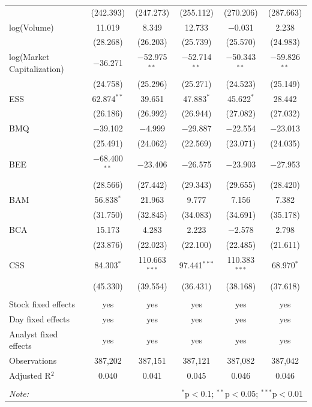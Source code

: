 \begin{tabular}{@{\extracolsep{5pt}}lccccc}
  & (242.393) & (247.273) & (255.112) & (270.206) & (287.663) \\ 
  log(Volume) & 11.019 & 8.349 & 12.733 & $-$0.031 & 2.238 \\ 
  & (28.268) & (26.203) & (25.739) & (25.570) & (24.983) \\ 
  log(Market Capitalization) & $-$36.271 & $-$52.975$^{**}$ & $-$52.714$^{**}$ & $-$50.343$^{**}$ & $-$59.826$^{**}$ \\ 
  & (24.758) & (25.296) & (25.271) & (24.523) & (25.149) \\ 
  ESS & 62.874$^{**}$ & 39.651 & 47.883$^{*}$ & 45.622$^{*}$ & 28.442 \\ 
  & (26.186) & (26.992) & (26.944) & (27.082) & (27.032) \\ 
  BMQ & $-$39.102 & $-$4.999 & $-$29.887 & $-$22.554 & $-$23.013 \\ 
  & (25.491) & (24.062) & (22.569) & (23.071) & (24.035) \\ 
  BEE & $-$68.400$^{**}$ & $-$23.406 & $-$26.575 & $-$23.903 & $-$27.953 \\ 
  & (28.566) & (27.442) & (29.343) & (29.655) & (28.420) \\ 
  BAM & 56.838$^{*}$ & 21.963 & 9.777 & 7.156 & 7.382 \\ 
  & (31.750) & (32.845) & (34.083) & (34.691) & (35.178) \\ 
  BCA & 15.173 & 4.283 & 2.223 & $-$2.578 & 2.798 \\ 
  & (23.876) & (22.023) & (22.100) & (22.485) & (21.611) \\ 
  CSS & 84.303$^{*}$ & 110.663$^{***}$ & 97.441$^{***}$ & 110.383$^{***}$ & 68.970$^{*}$ \\ 
  & (45.330) & (39.554) & (36.431) & (38.168) & (37.618) \\ 
 \hline \\[-1.8ex] 
Stock fixed effects & yes & yes & yes & yes & yes \\ 
Day fixed effects & yes & yes & yes & yes & yes \\ 
Analyst fixed effects & yes & yes & yes & yes & yes \\ 
Observations & 387,202 & 387,151 & 387,121 & 387,082 & 387,042 \\ 
Adjusted R$^{2}$ & 0.040 & 0.041 & 0.045 & 0.046 & 0.046 \\ 
\hline 
\hline \\[-1.8ex] 
\textit{Note:}  & \multicolumn{5}{r}{$^{*}$p$<$0.1; $^{**}$p$<$0.05; $^{***}$p$<$0.01} \\ 
\end{tabular} 
